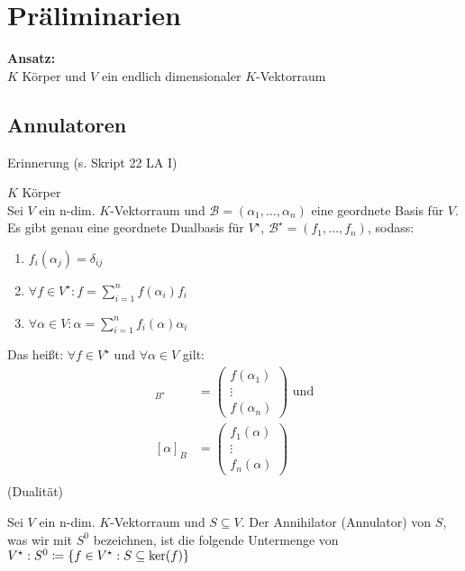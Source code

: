 \section{Präliminarien}
\textbf{Ansatz:}\\
$ K $ Körper und $ V $ ein endlich dimensionaler $ K $-Vektorraum
\subsection{Annulatoren}
Erinnerung (s. Skript 22 LA I)
\begin{subtheorem*}
	$ K $ Körper\\
	Sei $ V $ ein n-dim. $ K $-Vektorraum und $ \mathcal{B} = \left( \alpha_1, \dotsc, \alpha_n \right)  $ eine geordnete Basis für $ V $.
	Es gibt genau eine geordnete Dualbasis für $ V^\star $, $ \mathcal{B}^\star = \left( f_1, \dotsc, f_n \right)  $, sodass:
	\begin{enumerate}[label=(\arabic*)]
		\item $ f_i (\alpha_j) = \delta_{ij}  $
		\item $ \forall f \in V^\star : f = \sum_{i = 1}^{n} f(\alpha_i) f_i $
		\item $ \forall \alpha \in V : \alpha = \sum_{i=1}^{n} f_i(\alpha) \alpha_i $
	\end{enumerate}
	Das heißt: $ \forall f \in V^\star $ und $ \forall \alpha \in V $ gilt:
	\begin{align*}
		[f]_{B^\star} &= \begin{pmatrix} f(\alpha_1) \\ \vdots \\ f(\alpha_n) \end{pmatrix} \text{ und}  \\
		[\alpha]_{B} &= \begin{pmatrix} f_1(\alpha) \\ \vdots \\ f_n(\alpha) \end{pmatrix}  \\
	\end{align*}
	(Dualität)
\end{subtheorem*}

\begin{subdefinition}
	Sei $ V $ ein n-dim. $ K $-Vektorraum und $ S \subseteq V $. Der Annihilator (Annulator) von $ S $, was wir mit $ S^0 $ bezeichnen, ist die folgende Untermenge von $ V^\star : S^0 \coloneqq \left\{ f \in V^\star : S \subseteq \operatorname{ker}(f) \right\}  $
\end{subdefinition}

